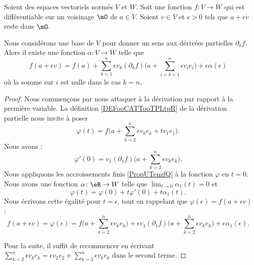 \begin{lemma}       \label{LEMooNMTAooLgMkgH}
    Soient des espaces vectoriels normés \( V\) et \( W\). Soit une fonction \( f\colon V\to W\) qui est différentiable sur un voisinage \( \mO\) de \( a\in V\). Soient \( v\in V\) et \( \epsilon>0\) tels que \(a+\epsilon v\) reste dans \( \mO\).

    Nous considérons une base de \( V\) pour donner un sens aux dérivées partielles \( \partial_kf\). Alors il existe une fonction \( \alpha\colon V\to W\) telle que
    \begin{equation}
        f(a+\epsilon v)=f(a)+\sum_{k=1}^n\epsilon v_k (\partial_kf)\big( a+\sum_{i=k+1}^n\epsilon v_ie_i \big)+\epsilon\alpha(\epsilon)
    \end{equation}
    où la somme sur \( i\) est nulle dans le cas \( k=n\).
\end{lemma}

\begin{proof}
    Nous commençons par nous attaquer à la dérivation par rapport à la première variable. La définition \ref{DEFooCATTooTPLtpR} de la dérivation partielle nous invite à poser
    \begin{equation}
        \varphi(t)=f\big( a+\sum_{k=2}^n\epsilon v_ke_k+tv_1e_1 \big).
    \end{equation}
    Nous avons :
    \begin{equation}
        \varphi'(0)=v_1(\partial_1f)\big( a+\sum_{k=2}^n\epsilon v_ke_k \big).
    \end{equation}
    Nous appliquons les accroissements finis \ref{PropUTenzfQ} à la fonction \( \varphi\) en \( t=0\). Nous avons une fonction \( \alpha\colon \eR\to W\) telle que \( \lim_{t\to 0} \alpha_1(t)=0\) et
    \begin{equation}
        \varphi(t)=\varphi(0)+t\varphi'(0)+t\alpha_1(t).
    \end{equation}
    Nous écrivons cette égalité pour \( t=\epsilon\), tout en rappelant que \( \varphi(\epsilon)=f(a+\epsilon v)\) :
    \begin{equation}
        f(a+\epsilon v) =  \varphi(\epsilon)=f\big( a+\sum_{k=2}^n\epsilon v_ke_k \big)+\epsilon v_1(\partial_1f)\big( a+\sum_{k=2}^n \epsilon v_ke_k \big)+\epsilon \alpha_1(\epsilon).
    \end{equation}
    
    Pour la suite, il suffit de recommencer en écrivant \( \sum_{k=2}^n \epsilon v_ke_k=\epsilon v_2 e_2+\sum_{k=3}^n\epsilon v_k e_k\) dans le second terme.
\end{proof}

